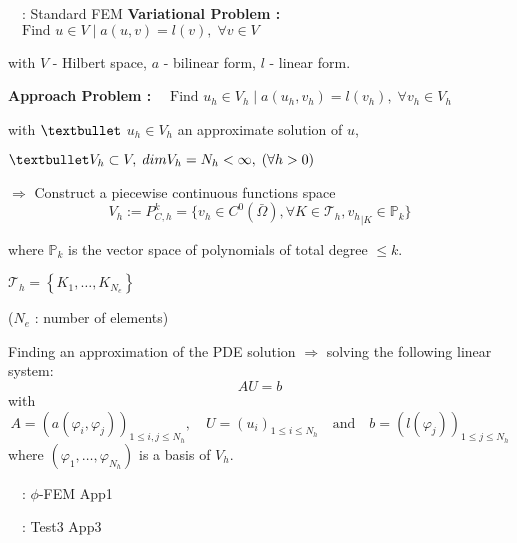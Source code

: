 \begin{frame}{\appendixname~\theappendixframenumber~: Standard FEM}
	\textbf{Variational Problem :} $\quad\text{Find } u\in V \; | \; a(u,v)=l(v), \;\forall v\in V$
	
	with $V$ - Hilbert space, $a$ - bilinear form, $l$ - linear form.
	
	\vspace{10pt}
	
	\begin{minipage}[t]{0.76\linewidth}
		\textbf{Approach Problem :} $\quad \text{Find } u_h\in V_h \; | \; a(u_h,v_h)=l(v_h), \;\forall v_h\in V_h$
		
		with $\textbullet$ $u_h\in V_h$ an approximate solution of $u$, 
		
		$\textbullet V_h\subset V, \; dim V_h=N_h<\infty, \; (\forall h>0)$ 
		
		$\Rightarrow$ Construct a piecewise continuous functions space
		\vspace{-5pt}
		\begin{equation*}
			V_h:=P_{C,h}^k=\{v_h\in C^0(\bar{\Omega}), \forall K\in\mathcal{T}_h, {v_h}_{|K}\in\mathbb{P}_k\}
		\end{equation*}
		
		where $\mathbb{P}_k$ is the vector space of polynomials of total degree $\le k$.
	\end{minipage} \hfill \begin{minipage}[t][][b]{0.2\linewidth}
		\vspace{-5pt}
		\centering
		
		\footnotesize
		$\mathcal{T}_h = \left\{K_1,\dots,K_{N_e}\right\}$
		
		\tiny
		($N_e$ : number of elements)
	\end{minipage}
	
	\vspace{10pt}
	
	Finding an approximation of the PDE solution $\Rightarrow$ solving the following linear system:
	\begin{equation*}
		AU=b
	\end{equation*}
	with
	\begin{equation*}
		A=(a(\varphi_i,\varphi_j))_{1\le i,j\le N_h}, \quad U=(u_i)_{1\le i\le N_h} \quad \text{and} \quad b=(l(\varphi_j))_{1\le j\le N_h}
	\end{equation*}
	where $(\varphi_1,\dots,\varphi_{N_h})$ is a basis of $V_h$.
\end{frame}
\addtocounter{appendixframenumber}{1}

\begin{frame}{\appendixname~\theappendixframenumber~: $\phi$-FEM}
	App1
\end{frame}
\addtocounter{appendixframenumber}{1}

\begin{frame}{\appendixname~\theappendixframenumber~: Test3}
	App3
\end{frame}
\addtocounter{appendixframenumber}{1}